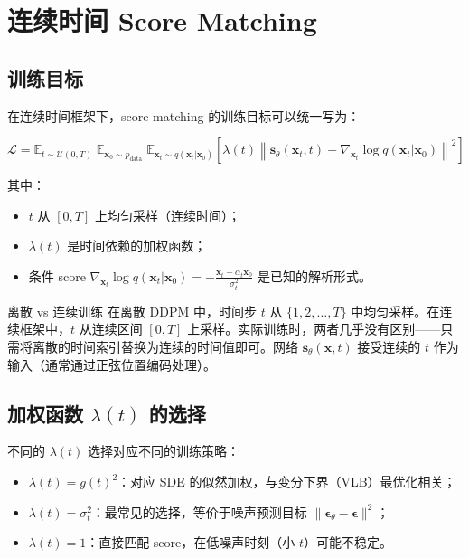 \section{连续时间 Score Matching}

\subsection{训练目标}

在连续时间框架下，score matching 的训练目标可以统一写为：

$$
\mathcal{L} = \mathbb{E}_{t \sim \mathcal{U}(0,T)}\;\mathbb{E}_{\mathbf{x}_0 \sim p_{\text{data}}}\;\mathbb{E}_{\mathbf{x}_t \sim q(\mathbf{x}_t|\mathbf{x}_0)}\left[\lambda(t)\left\|\mathbf{s}_\theta(\mathbf{x}_t, t) - \nabla_{\mathbf{x}_t}\log q(\mathbf{x}_t|\mathbf{x}_0)\right\|^2\right]
$$

其中：
\begin{itemize}
    \item $t$ 从 $[0, T]$ 上均匀采样（连续时间）；
    \item $\lambda(t)$ 是时间依赖的加权函数；
    \item 条件 score $\nabla_{\mathbf{x}_t}\log q(\mathbf{x}_t|\mathbf{x}_0) = -\frac{\mathbf{x}_t - \alpha_t \mathbf{x}_0}{\sigma_t^2}$ 是已知的解析形式。
\end{itemize}

\begin{importantbox}{离散 vs 连续训练}
在离散 DDPM 中，时间步 $t$ 从 $\{1, 2, \ldots, T\}$ 中均匀采样。在连续框架中，$t$ 从连续区间 $[0, T]$ 上采样。实际训练时，两者几乎没有区别——只需将离散的时间索引替换为连续的时间值即可。网络 $\mathbf{s}_\theta(\mathbf{x}, t)$ 接受连续的 $t$ 作为输入（通常通过正弦位置编码处理）。
\end{importantbox}

\subsection{加权函数 $\lambda(t)$ 的选择}

不同的 $\lambda(t)$ 选择对应不同的训练策略：

\begin{itemize}
    \item $\lambda(t) = g(t)^2$：对应 SDE 的似然加权，与变分下界（VLB）最优化相关；
    \item $\lambda(t) = \sigma_t^2$：最常见的选择，等价于噪声预测目标 $\|\boldsymbol{\epsilon}_\theta - \boldsymbol{\epsilon}\|^2$；
    \item $\lambda(t) = 1$：直接匹配 score，在低噪声时刻（小 $t$）可能不稳定。
\end{itemize}

